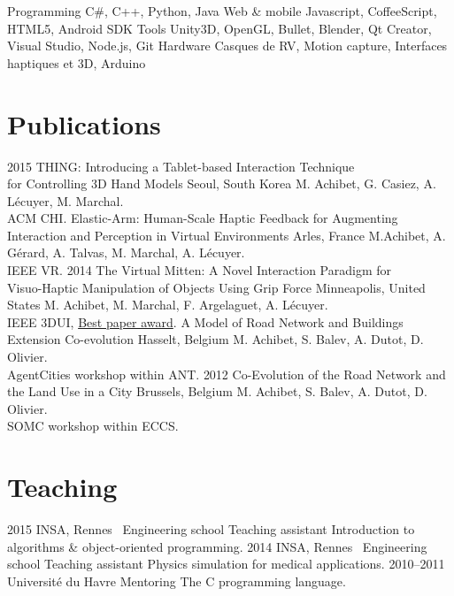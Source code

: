 \documentclass[]{friggeri-cv}
\begin{document}
\begin{entrylist}
	\entry
		{Programming}
		{C\#, C++, Python, Java}
		{}
		{}
	\entry
		{Web \& mobile}
		{Javascript, CoffeeScript, HTML5, Android SDK}
		{}
		{}
	\entry
		{Tools}
		{Unity3D, OpenGL, Bullet, Blender, Qt Creator, Visual Studio, Node.js, Git}
		{}
		{}
	\entry
		{Hardware}
		{Casques de RV, Motion capture, Interfaces haptiques et 3D, Arduino}
		{}
		{}
\end{entrylist}

\section{Publications}

\begin{entrylist}
  \entry
    {2015}
    {THING: Introducing a Tablet-based Interaction Technique\\ for Controlling 3D Hand Models}
    {Seoul, South Korea}
    {M. Achibet, G. Casiez, A. Lécuyer, M. Marchal.\\ ACM CHI.}
  \entry
    {}
    {Elastic-Arm: Human-Scale Haptic Feedback for Augmenting\\ Interaction and Perception in Virtual Environments}
    {Arles, France}
    {M.Achibet, A. Gérard, A. Talvas, M. Marchal, A. Lécuyer.\\ IEEE VR.}
  \entry
    {2014}
    {The Virtual Mitten: A Novel Interaction Paradigm for\\ Visuo-Haptic Manipulation of Objects Using Grip Force}
    {Minneapolis, United States}
    {M. Achibet, M. Marchal, F. Argelaguet, A. Lécuyer.\\ IEEE 3DUI, \underline{Best paper award}.}
  \entry
    {}
    {A Model of Road Network and Buildings Extension Co-evolution}
    {Hasselt, Belgium}
    {M. Achibet, S. Balev, A. Dutot, D. Olivier.\\ AgentCities workshop within ANT.}
  \entry
    {2012}
    {Co-Evolution of the Road Network and the Land Use in a City}
    {Brussels, Belgium}
    {M. Achibet, S. Balev, A. Dutot, D. Olivier.\\ SOMC workshop within ECCS.}
\end{entrylist}

\newpage

\section{Teaching}

\begin{entrylist}
  \entry
    {2015}
    {INSA, Rennes \textemdash\ Engineering school}
    {Teaching assistant}
    {Introduction to algorithms \& object-oriented programming.}
  \entry
    {2014}
    {INSA, Rennes \textemdash\ Engineering school}
    {Teaching assistant}
    {Physics simulation for medical applications.}
  \entry
    {2010–2011}
    {Université du Havre}
    {Mentoring}
    {The C programming language.}
\end{entrylist}
\end{document}

